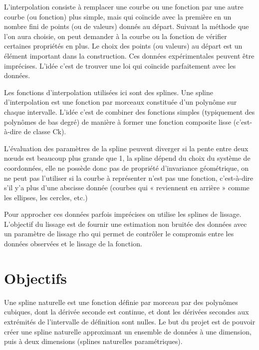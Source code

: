 \documentclass[a4paper,12pt]{article}
\begin{document}
L’interpolation consiste à remplacer une courbe ou une fonction par une autre courbe (ou fonction) plus simple, mais qui coïncide avec la première en un nombre fini de points (ou de valeurs) donnés au départ. Suivant la méthode que l’on aura choisie, on peut demander à la courbe ou la fonction de vérifier certaines propriétés en plus. Le choix des points (ou valeurs) au départ est un élément important dans la construction.
Ces données expérimentales peuvent être imprécises. L’idée c’est de trouver une loi qui coïncide parfaitement avec les données.

Les fonctions d’interpolation utilisées ici sont des splines.
Une spline d’interpolation est une fonction par morceaux constituée d’un polynôme sur chaque intervalle.
L’idée c’est de combiner des fonctions simples (typiquement des polynômes de bas degré) de manière à former une fonction composite lisse (c’est-à-dire de classe Ck).

L’évaluation des paramètres de la spline peuvent diverger si la pente entre deux nœuds est beaucoup plus grande que 1, la spline dépend du choix du système de coordonnées, elle ne possède donc pas de propriété d’invariance géométrique, on ne peut pas l’utiliser si la courbe à représenter n’est pas une fonction, c’est-à-dire s’il y’a plus d’une abscisse donnée (courbes qui « reviennent en arrière » comme les ellipses, les cercles, etc.)

Pour approcher ces données parfois imprécises on utilise les splines de lissage. L’objectif du lissage est de fournir une estimation non bruitée des données avec un paramètre de lissage rho qui permet de contrôler le compromis entre les données observées et le lissage de la fonction.

\newpage
\section{Objectifs}

Une spline naturelle est une fonction définie par morceau par des polynômes cubiques, dont la dérivée seconde est continue, et dont les dérivées secondes aux extrémités de l'intervalle de définition sont nulles.
Le but du projet est de pouvoir créer une spline naturelle approximant un ensemble de données à une dimension, puis à deux dimensions (splines naturelles paramétriques).
\end{document}
